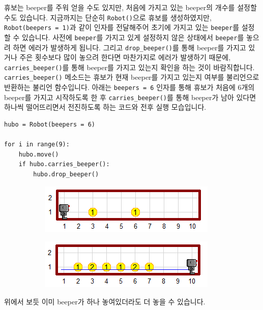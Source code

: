 \documentclass[../main.tex]{subfiles}
\begin{document}
휴보는 beeper를 주워 얻을 수도 있지만, 처음에 가지고 있는 beeper의 개수를 설정할 수도 있습니다.
지금까지는 단순히 \texttt{Robot()}으로 휴보를 생성하였지만, \texttt{Robot(beepers = 1)}과 같이 인자를 전달해주어 초기에 가지고 있는 \texttt{beeper}를 설정할 수 있습니다.
사전에 \texttt{beeper}를 가지고 있게 설정하지 않은 상태에서 \texttt{beeper}를 놓으려 하면 에러가 발생하게 됩니다.
그리고 \texttt{drop\_beeper()}를 통해 beeper를 가지고 있거나 주은 횟수보다 많이 놓으려 한다면 마찬가지로 에러가 발생하기 때문에, \texttt{carries\_beeper()}를 통해 beeper를 가지고 있는지 확인을 하는 것이 바람직합니다.
\texttt{carries\_beeper()} 메소드는 휴보가 현재 beeper를 가지고 있는지 여부를 불리언으로 반환하는 불리언 함수입니다.
아래는 \texttt{beepers = 6} 인자를 통해 휴보가 처음에 6개의 beeper를 가지고 시작하도록 한 후 \texttt{carries\_beeper()}를 통해 beeper가 남아 있다면 하나씩 떨어뜨리면서 전진하도록 하는 코드와 전후 실행 모습입니다.
\begin{verbatim}
hubo = Robot(beepers = 6)

for i in range(9):
	hubo.move()
	if hubo.carries_beeper():
		hubo.drop_beeper()
\end{verbatim}
\begin{figure}[H]
\centering
\begin{subfigure}{.5\textwidth}
\centering
\includegraphics[width=.9\linewidth]{"./lectures/lecture5_pickbeeperbef"}
\label{fig:lecture5putbeeperbef}
\end{subfigure}%
\begin{subfigure}{.5\textwidth}
\centering
\includegraphics[width=.9\linewidth]{"./lectures/lecture5_putbeeperaft"}
\label{fig:lecture5putbeeperaft}
\end{subfigure}
\end{figure}
위에서 보듯 이미 beeper가 하나 놓여있더라도 더 놓을 수 있습니다.
\end{document}
